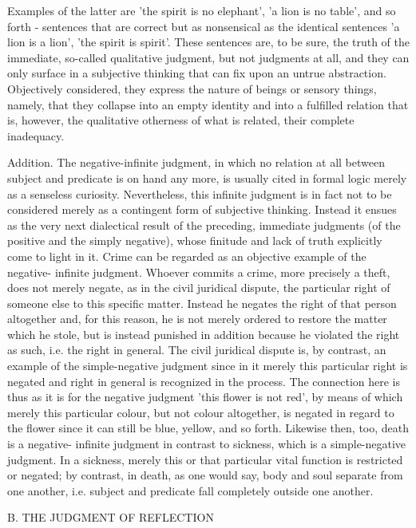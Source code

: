     Examples of the latter are 'the spirit is no elephant',
    'a lion is no table', and so forth - sentences that are correct
    but as nonsensical as the identical sentences 'a lion is a lion',
    'the spirit is spirit'. These sentences are, to be sure,
    the truth of the immediate, so-called qualitative judgment,
    but not judgments at all, and they can only surface in
    a subjective thinking that can fix upon an untrue abstraction.
    Objectively considered, they express the nature of beings
    or sensory things, namely, that they collapse into an
    empty identity and into a fulfilled relation that is, however,
    the qualitative otherness of what is related, their complete inadequacy.

Addition. The negative-infinite judgment, in which no relation at all between
subject and predicate is on hand any more, is usually cited in formal logic merely
as a senseless curiosity. Nevertheless, this infinite judgment is in fact not
to be considered merely as a contingent form of subjective thinking. Instead it
ensues as the very next dialectical result of the preceding, immediate judgments (of
the positive and the simply negative), whose finitude and lack of truth explicitly
come to light in it. Crime can be regarded as an objective example of the negative-
infinite judgment. Whoever commits a crime, more precisely a theft, does not
merely negate, as in the civil juridical dispute, the particular right of someone
else to this specific matter. Instead he negates the right of that person altogether
and, for this reason, he is not merely ordered to restore the matter which he stole,
but is instead punished in addition because he violated the right as such, i.e.
the right in general. The civil juridical dispute is, by contrast, an example of the
simple-negative judgment since in it merely this particular right is negated and
right in general is recognized in the process. The connection here is thus as it is
for the negative judgment 'this flower is not red', by means of which merely this
particular colour, but not colour altogether, is negated in regard to the flower since
it can still be blue, yellow, and so forth. Likewise then, too, death is a negative-
infinite judgment in contrast to sickness, which is a simple-negative judgment. In
a sickness, merely this or that particular vital function is restricted or negated; by
contrast, in death, as one would say, body and soul separate from one another, i.e.
subject and predicate fall completely outside one another.

B. THE JUDGMENT OF REFLECTION

